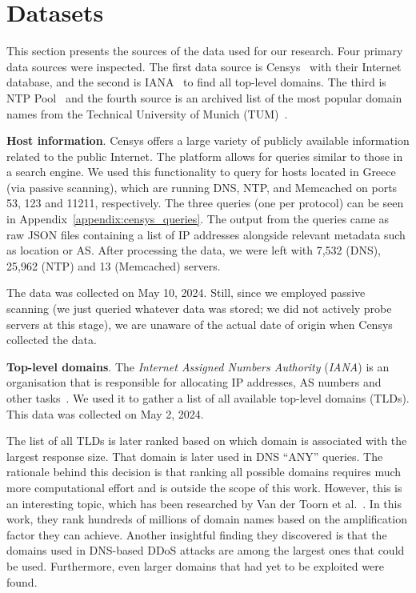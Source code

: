 \section{Datasets}
 This section presents the sources of the data used for our research. Four primary data sources were inspected. The first data source is Censys~\cite{censys15} with their Internet database, and the second is IANA~\cite{iana} to find all top-level domains. The third is NTP Pool~\cite{ntp_pool} and the fourth source is an archived list of the most popular domain names from the Technical University of Munich (TUM)~\cite{tum_domains}.

 \textbf{Host information}. Censys offers a large variety of publicly available information related to the public Internet. The platform allows for queries similar to those in a search engine. We used this functionality to query for hosts located in Greece (via passive scanning), which are running DNS, NTP, and Memcached on ports 53, 123 and 11211, respectively. The three queries (one per protocol) can be seen in Appendix~\ref{appendix:censys_queries}. The output from the queries came as raw JSON files containing a list of IP addresses alongside relevant metadata such as location or AS. After processing the data, we were left with 7,532 (DNS), 25,962 (NTP) and 13 (Memcached) servers. 

 The data was collected on May 10, 2024. Still, since we employed passive scanning (we just queried whatever data was stored; we did not actively probe servers at this stage), we are unaware of the actual date of origin when Censys collected the data. 

 \textbf{Top-level domains}. The \textit{Internet Assigned Numbers Authority} (\textit{IANA}) is an organisation that is responsible for allocating IP addresses, AS numbers and other tasks~\cite{iana}. We used it to gather a list of all available top-level domains (TLDs). This data was collected on May 2, 2024. 

 The list of all TLDs is later ranked based on which domain is associated with the largest response size. That domain is later used in DNS ``ANY'' queries. The rationale behind this decision is that ranking all possible domains requires much more computational effort and is outside the scope of this work. However, this is an interesting topic, which has been researched by Van der Toorn et al.~\cite{van_der_toorn_anyway_2021}. In this work, they rank hundreds of millions of domain names based on the amplification factor they can achieve. Another insightful finding they discovered is that the domains used in DNS-based DDoS attacks are among the largest ones that could be used. Furthermore, even larger domains that had yet to be exploited were found.

